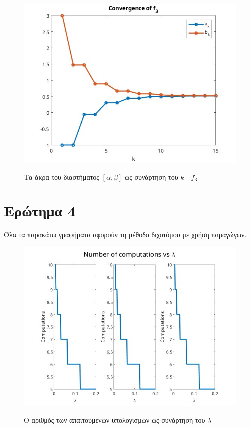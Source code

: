 \begin{figure}[H]
    \includegraphics[scale=0.7]{plots/ex3/f3.jpg}
    \label{fig:funcs}
    \caption{Τα άκρα του διαστήματος $[\alpha, \beta]$ ως συνάρτηση του $k$ - $f_3$}
    \centering
\end{figure}

\section{Ερώτημα 4}

Όλα τα παρακάτω γραφήματα αφορούν τη μέθοδο διχοτόμου με χρήση παραγώγων.

\begin{figure}[H]
    \includegraphics[scale=0.7]{plots/ex4/l_comps.jpg}
    \label{fig:funcs}
    \caption{Ο αριθμός των απαιτούμενων υπολογισμών ως συνάρτηση του $\lambda$}
    \centering
\end{figure}

